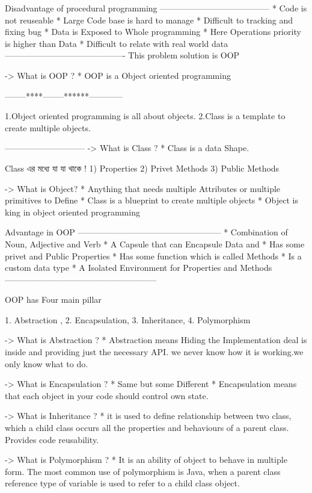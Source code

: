 Disadvantage of procedural programming 
---------------------------------------
* Code is not reuseable
* Large Code base is hard to manage
* Difficult to tracking and fixing bug
* Data is Exposed to Whole programming
* Here Operations priority is higher than Data
* Difficult to relate with real world data 
-------------------------------------------
This problem solution is OOP 


-> What is OOP ?
  * OOP is a Object oriented programming

  --------****--------******------------

  1.Object oriented programming is all about objects.
  2.Class is a template to create multiple objects.


-----------------------------
  -> What is Class ?
    * Class is a data Shape.

  Class এর মধ্যে যা যা থাকে !
     1) Properties
     2) Privet Methods
     3) Public Methods



  -> What is Object?
     * Anything that needs multiple Attributes or multiple primitives to Define
     * Class is a blueprint to create multiple objects 
     * Object is king in object oriented programming


  Advantage in OOP
  ---------------------------------------------------
  * Combination of Noun, Adjective and Verb
  * A Capsule that can Encapsule Data and 
  * Has some privet and Public Properties
  * Has some function which is called Methods
  * Is a custom data type
  * A Isolated Environment for Properties and Methods
  ------------------------------------------------------


  OOP has Four main pillar

    1. Abstraction , 2. Encapsulation, 3. Inheritance, 4. Polymorphism


 -> What is Abstraction ?
    * Abstraction means Hiding the Implementation deal is inside and providing
      just the necessary API. we never know how it is working.we only know what 
      to do.
 
 -> What is Encapsulation ?
    * Same but some Different
    * Encapsulation means that each object in your code should control own state.
 
 -> What is Inheritance ?
    * it is used to define relationship between two class, 
      which a child class occurs all the properties and behaviours of a parent class. 
      Provides code reusability.

 -> What is Polymorphism ?
   * It is an ability of object to behave in multiple
     form. The most common use of polymorphism is Java, when a
     parent class reference type of variable is used to refer to a child
     class object.
     